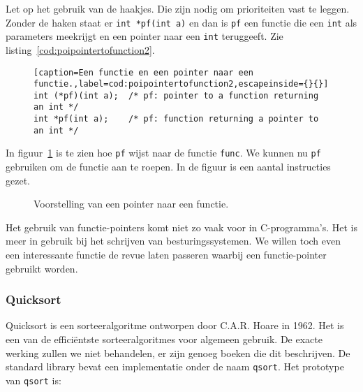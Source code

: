 Let op het gebruik van de haakjes. Die zijn nodig om prioriteiten vast te leggen. Zonder de haken staat er \texttt{int *pf(int a)} en dan is \texttt{pf} een functie die een \texttt{int} als parameters meekrijgt en een pointer naar een \texttt{int} teruggeeft. Zie listing~\ref{cod:poipointertofunction2}.

\begin{figure}[H]
\begin{lstlisting}[caption=Een functie en een pointer naar een functie.,label=cod:poipointertofunction2,escapeinside={}{}]
int (*pf)(int a);  /* pf: pointer to a function returning an int */
int *pf(int a);    /* pf: function returning a pointer to an int */
\end{lstlisting}
\end{figure}

In figuur~\ref{fig:poipointertofunction} is te zien hoe \texttt{pf} wijst naar de functie \texttt{func}. We kunnen nu \texttt{pf} gebruiken om de functie aan te roepen. In de figuur is een aantal instructies gezet.

\begin{figure}[!ht]
\centering
{}
\caption{Voorstelling van een pointer naar een functie.}
\label{fig:poipointertofunction}
\end{figure}

Het gebruik van functie-pointers komt niet zo vaak voor in C-programma's. Het is meer in gebruik bij het schrijven van besturingssystemen. We willen toch even een interessante functie de revue laten passeren waarbij een functie-pointer gebruikt worden.

\subsubsection*{Quicksort}
Quicksort is een sorteeralgoritme ontworpen door C.A.R. Hoare in 1962. Het is een van de efficiëntste sorteeralgoritmes voor algemeen gebruik. De exacte werking zullen we niet behandelen, er zijn genoeg boeken die dit beschrijven. De standard library bevat een implementatie onder de naam \texttt{qsort}. Het prototype van \texttt{qsort} is:


